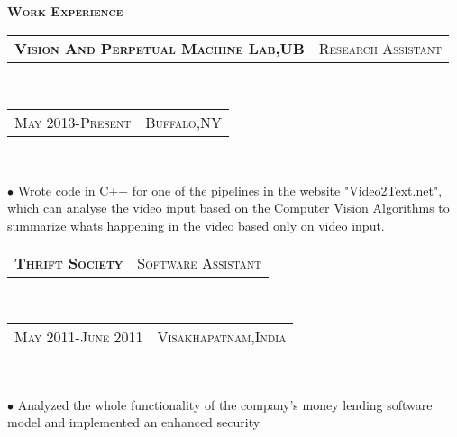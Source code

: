 \documentclass[10pt,a4paper,oneside]{article}
\begin{document}
    \begin{minipage}[t]{0.63\textwidth}
        \vspace{0pt}
        \textcolor{light-gray}{\textbf{\large W\textsc{ork} E\textsc{xperience}}}
        \vspace{10pt}\\
        \begin{tabular}{c|c}
            \textbf{\normalsize V\textsc{ision} A\textsc{nd} P\textsc{erpetual} M\textsc{achine} L\textsc{ab},UB}
            &\textmd{\normalsize R\textsc{esearch} A\textsc{ssistant}}
        \end{tabular}\\
        \textcolor{light-gray}{
            \begin{tabular}{c|c}
                {\small M\textsc{ay 2013}-P\textsc{resent}}
               &{\small B\textsc{uffalo},NY}
            \end{tabular}
        }\\ 
        \vspace{-4mm}
        \begin{adjustwidth}{7pt}{0pt}
            {\footnotesize $\bullet$ Wrote code in C++ for one of the pipelines in the website "Video2Text.net", which can analyse 
            the video input based on the Computer Vision Algorithms to
            summarize whats happening in the video based only on video input.}\\
        \end{adjustwidth}
        \begin{tabular}{c|c}
            \textbf{\normalsize T\textsc{hrift} S\textsc{ociety}}
            &\textmd{\normalsize S\textsc{oftware} A\textsc{ssistant}}
        \end{tabular}\\
        \textcolor{light-gray}{
            \begin{tabular}{c|c}
                {\small M\textsc{ay 2011}-J\textsc{une 2011}}
                &{\small V\textsc{isakhapatnam},I\textsc{ndia}}
            \end{tabular}
        }\\ 
        \vspace{-4mm}
        \begin{adjustwidth}{7pt}{0pt}
            {\footnotesize $\bullet$ Analyzed the whole functionality of the company's money lending software model and implemented an enhanced security
}
\end{adjustwidth}
\end{minipage}
\end{document}
